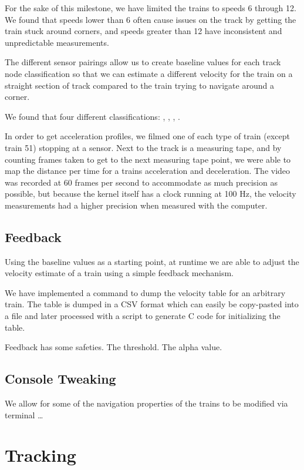 \documentclass[pdftex,10pt,a4paper]{article}
\begin{document}
For the sake of this milestone, we have limited the trains to speeds 6
through 12. We found that speeds lower than 6 often cause issues on
the track by getting the train stuck around corners, and speeds
greater than 12 have inconsistent and unpredictable measurements.

The different sensor pairings allow us to create baseline values for
each track node classification so that we can estimate a different
velocity for the train on a straight section of track compared to the
train trying to navigate around a corner.

We found that four different classifications: ,
, , .

In order to get acceleration profiles, we filmed one of each type of
train (except train 51) stopping at a sensor. Next to the track is a
measuring tape, and by counting frames taken to get to the next
measuring tape point, we were able to map the distance per time for a
trains acceleration and deceleration. The video was recorded at 60
frames per second to accommodate as much precision as possible, but
because the kernel itself has a clock running at 100 Hz, the velocity
measurements had a higher precision when measured with the computer.

\subsection*{Feedback}

Using the baseline values as a starting point, at runtime we are able
to adjust the velocity estimate of a train using a simple feedback
mechanism.

We have implemented a  command to dump the velocity table for
an arbitrary train. The table is dumped in a CSV format which can
easily be copy-pasted into a file and later processed with a script to
generate C code for initializing the table.

Feedback has some safeties. The threshold. The alpha value.

\subsection*{Console Tweaking}

We allow for some of the navigation properties of the trains to be modified via
terminal \ldots


\section*{Tracking}
\end{document}
